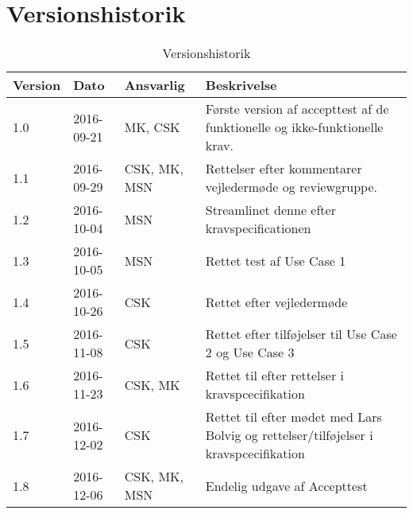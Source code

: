 \chapter{Versionshistorik}\label{Versionshistorik}

\begin{table}[htb]
\begin{tabular}{ | l | l | l | p{} | }
\hline
\textbf{Version} & \textbf{Dato} & \textbf{Ansvarlig} & \textbf{Beskrivelse} \\\hline
1.0 & 2016-09-21 & MK, CSK & Første version af accepttest af de funktionelle og ikke-funktionelle krav.\\\hline
1.1 & 2016-09-29 & CSK, MK, MSN & Rettelser efter kommentarer vejledermøde og reviewgruppe. \\\hline
1.2 & 2016-10-04 & MSN & Streamlinet denne efter kravspecificationen \\\hline
1.3 & 2016-10-05 & MSN & Rettet test af Use Case 1 \\\hline
1.4 & 2016-10-26 & CSK & Rettet efter vejledermøde \\\hline
1.5 & 2016-11-08 & CSK & Rettet efter tilføjelser til Use Case 2 og Use Case 3 \\\hline
1.6 & 2016-11-23 & CSK, MK & Rettet til efter rettelser i kravspcecifikation \\\hline
1.7 & 2016-12-02 & CSK & Rettet til efter mødet med Lars Bolvig og rettelser/tilføjelser i kravspcecifikation \\\hline
1.8 & 2016-12-06 & CSK, MK, MSN & Endelig udgave af Accepttest \\\hline
\end{tabular}
\caption{Versionshistorik}
\end{table}
\newpage 